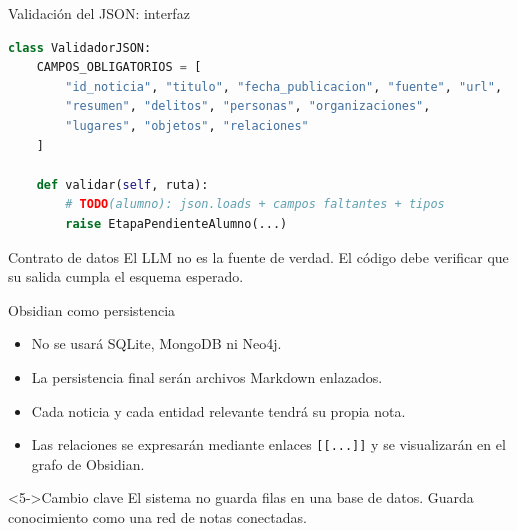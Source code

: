 \documentclass[11pt,aspectratio=169]{beamer}
\newcommand{\code}[1]{\texttt{#1}}
\begin{document}
\begin{frame}[fragile]{Validación del JSON: interfaz}
\tiny
\begin{lstlisting}[language=Python]
class ValidadorJSON:
    CAMPOS_OBLIGATORIOS = [
        "id_noticia", "titulo", "fecha_publicacion", "fuente", "url",
        "resumen", "delitos", "personas", "organizaciones",
        "lugares", "objetos", "relaciones"
    ]

    def validar(self, ruta):
        # TODO(alumno): json.loads + campos faltantes + tipos
        raise EtapaPendienteAlumno(...)
\end{lstlisting}

\scriptsize
\begin{block}{Contrato de datos}
El LLM no es la fuente de verdad. El código debe verificar que su salida cumpla el esquema esperado.
\end{block}
\end{frame}

\begin{frame}{Obsidian como persistencia}
\small
\begin{itemize}[<+->]
\item No se usará SQLite, MongoDB ni Neo4j.
\item La persistencia final serán archivos Markdown enlazados.
\item Cada noticia y cada entidad relevante tendrá su propia nota.
\item Las relaciones se expresarán mediante enlaces \code{[[...]]} y se visualizarán en el grafo de Obsidian.
\end{itemize}

\begin{alertblock}<5->{Cambio clave}
El sistema no guarda filas en una base de datos. Guarda conocimiento como una red de notas conectadas.
\end{alertblock}
\end{frame}
\end{document}
